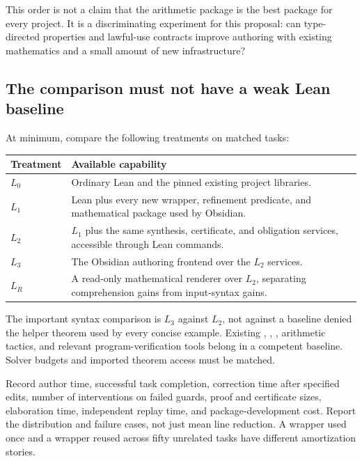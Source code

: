 \documentclass[11pt,a4paper]{article}
\newcommand{\code}[1]{\texttt{\detokenize{#1}}}
\theoremstyle{plain}\newtheorem{proposition}{Proposition}[section]
\theoremstyle{definition}\newtheorem{definition}[proposition]{Definition}
\theoremstyle{remark}\newtheorem{remark}[proposition]{Remark}
\begin{document}
This order is not a claim that the arithmetic package is the best package for every project. It is a discriminating experiment for this proposal: can type-directed properties and lawful-use contracts improve authoring with existing mathematics and a small amount of new infrastructure?

\subsection{The comparison must not have a weak Lean baseline}
At minimum, compare the following treatments on matched tasks:
\begin{center}\small
\begin{tabularx}{\textwidth}{@{}P{.12\textwidth}Y@{}}
\toprule
Treatment & Available capability\\
\midrule
\(L_0\) & Ordinary Lean and the pinned existing project libraries.\\
\(L_1\) & Lean plus every new wrapper, refinement predicate, and mathematical package used by Obsidian.\\
\(L_2\) & \(L_1\) plus the same synthesis, certificate, and obligation services, accessible through Lean commands.\\
\(L_3\) & The Obsidian authoring frontend over the \(L_2\) services.\\
\(L_R\) & A read-only mathematical renderer over \(L_2\), separating comprehension gains from input-syntax gains.\\
\bottomrule
\end{tabularx}
\end{center}
The important syntax comparison is \(L_3\) against \(L_2\), not against a baseline denied the helper theorem used by every concise example. Existing \code{fun_prop}, \code{simp}, \code{aesop}, arithmetic tactics, and relevant program-verification tools belong in a competent baseline. Solver budgets and imported theorem access must be matched.

Record author time, successful task completion, correction time after specified edits, number of interventions on failed guards, proof and certificate sizes, elaboration time, independent replay time, and package-development cost. Report the distribution and failure cases, not just mean line reduction. A wrapper used once and a wrapper reused across fifty unrelated tasks have different amortization stories.
\end{document}
